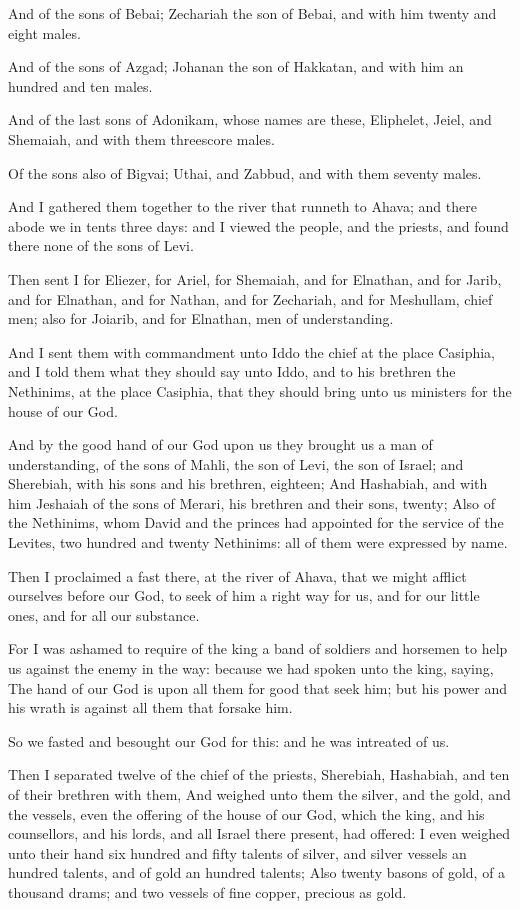\verse And of the sons of Bebai; Zechariah the son of Bebai, and with him twenty and eight males.

\verse And of the sons of Azgad; Johanan the son of Hakkatan, and with him an hundred and ten males.

\verse And of the last sons of Adonikam, whose names are these, Eliphelet, Jeiel, and Shemaiah, and with them threescore males.

\verse Of the sons also of Bigvai; Uthai, and Zabbud, and with them seventy males.

\verse And I gathered them together to the river that runneth to Ahava; and there abode we in tents three days: and I viewed the people, and the priests, and found there none of the sons of Levi.

\verse Then sent I for Eliezer, for Ariel, for Shemaiah, and for Elnathan, and for Jarib, and for Elnathan, and for Nathan, and for Zechariah, and for Meshullam, chief men; also for Joiarib, and for Elnathan, men of understanding.

\verse And I sent them with commandment unto Iddo the chief at the place Casiphia, and I told them what they should say unto Iddo, and to his brethren the Nethinims, at the place Casiphia, that they should bring unto us ministers for the house of our God.

\verse And by the good hand of our God upon us they brought us a man of understanding, of the sons of Mahli, the son of Levi, the son of Israel; and Sherebiah, with his sons and his brethren, eighteen; \verse And Hashabiah, and with him Jeshaiah of the sons of Merari, his brethren and their sons, twenty; \verse Also of the Nethinims, whom David and the princes had appointed for the service of the Levites, two hundred and twenty Nethinims: all of them were expressed by name.

\verse Then I proclaimed a fast there, at the river of Ahava, that we might afflict ourselves before our God, to seek of him a right way for us, and for our little ones, and for all our substance.

\verse For I was ashamed to require of the king a band of soldiers and horsemen to help us against the enemy in the way: because we had spoken unto the king, saying, The hand of our God is upon all them for good that seek him; but his power and his wrath is against all them that forsake him.

\verse So we fasted and besought our God for this: and he was intreated of us.

\verse Then I separated twelve of the chief of the priests, Sherebiah, Hashabiah, and ten of their brethren with them, \verse And weighed unto them the silver, and the gold, and the vessels, even the offering of the house of our God, which the king, and his counsellors, and his lords, and all Israel there present, had offered: \verse I even weighed unto their hand six hundred and fifty talents of silver, and silver vessels an hundred talents, and of gold an hundred talents; \verse Also twenty basons of gold, of a thousand drams; and two vessels of fine copper, precious as gold.

